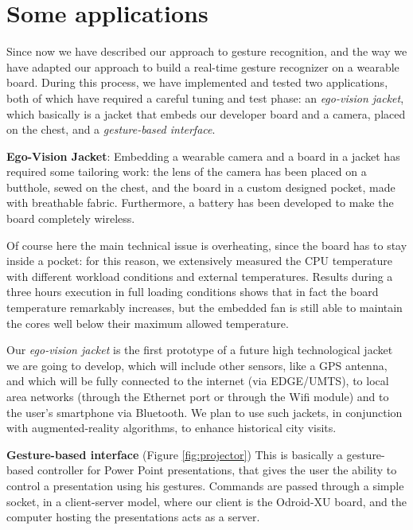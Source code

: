 \section{Some applications}
Since now we have described our approach to gesture recognition, and the way we have adapted our approach to build a real-time gesture recognizer on a wearable board. During this process, we have implemented and tested two applications, both of which have required a careful tuning and test phase: an \textit{ego-vision jacket}, which basically is a jacket that embeds our developer board and a camera, placed on the chest, and a \textit{gesture-based interface}.

\textbf{Ego-Vision Jacket}: Embedding a wearable camera and a board in a jacket has required some tailoring work: the lens of the camera has been placed on a butthole, sewed on the chest, and the board in a custom designed pocket, made with breathable fabric. Furthermore, a battery has been developed to make the board completely wireless. 

Of course here the main technical issue is overheating, since the board has to stay inside a pocket: for this reason, we extensively measured the CPU temperature with different workload conditions and external temperatures. Results during a three hours execution in full loading conditions shows that in fact the board temperature remarkably increases, but the embedded fan is still able to maintain the cores well below their maximum allowed temperature.

Our \textit{ego-vision jacket} is the first prototype of a future high technological jacket we are going to develop, which will include other sensors, like a GPS antenna, and which will be fully connected to the internet (via EDGE/UMTS), to local area networks (through the Ethernet port or through the Wifi module) and to the user's smartphone via Bluetooth. We plan to use such jackets, in conjunction with augmented-reality algorithms, to enhance historical city visits.

\textbf{Gesture-based interface} (Figure \ref{fig:projector})
This is basically a gesture-based controller for Power Point presentations, that gives the user the ability to control a presentation using his gestures. Commands are passed through a simple socket, in a client-server model, where our client is the Odroid-XU board, and the computer hosting the presentations acts as a server.

